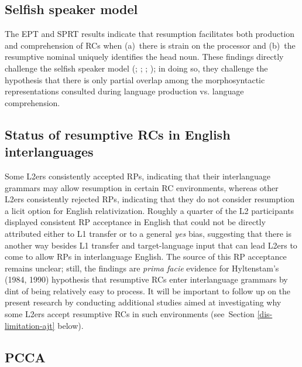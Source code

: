 \subsection{Selfish speaker model}

The EPT and SPRT results indicate that resumption facilitates both production and comprehension of RCs when (a)~there is strain on the processor and (b)~the resumptive nominal uniquely identifies the head noun. These findings directly challenge the selfish speaker model (\cite{ferreira.swets2005}; \cite{heestand.etal2011}; \cite{morgan.etal2020}; \cite{polinsky.etal2013}); in doing so, they challenge the hypothesis that there is only partial overlap among the morphosyntactic representations consulted during language production vs. language comprehension.

\subsection{Status of resumptive RCs in English interlanguages}

Some L2ers consistently accepted RPs, indicating that their interlanguage grammars may allow resumption in certain RC environments, whereas other L2ers consistently rejected RPs, indicating that they do not consider resumption a licit option for English relativization. Roughly a quarter of the L2 participants displayed consistent RP acceptance in English that could not be directly attributed either to L1 transfer or to a general \textit{yes} bias, suggesting that there is another way besides L1 transfer and target-language input that can lead L2ers to come to allow RPs in interlanguage English. The source of this RP acceptance remains unclear; still, the findings are \textit{prima facie} evidence for Hyltenstam's (1984, 1990) hypothesis that resumptive RCs enter interlanguage grammars by dint of being relatively easy to process. It will be important to follow up on the present research by conducting additional studies aimed at investigating why some L2ers accept resumptive RCs in such environments (see~Section \ref{dis-limitation-ajt} below).

\subsection{PCCA}

